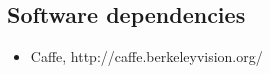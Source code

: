 \begin{appendices}
\section{Software dependencies}
\begin{itemize}
\item Caffe, http://caffe.berkeleyvision.org/
\end{itemize}
\end{appendices}